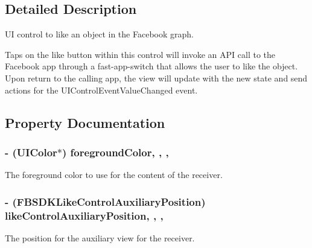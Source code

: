 \subsection{Detailed Description}
U\+I control to like an object in the Facebook graph.

Taps on the like button within this control will invoke an A\+P\+I call to the Facebook app through a fast-\/app-\/switch that allows the user to like the object. Upon return to the calling app, the view will update with the new state and send actions for the U\+I\+Control\+Event\+Value\+Changed event. 

\subsection{Property Documentation}
\hypertarget{interface_f_b_s_d_k_like_control_a078c28c8d5545d68a6887dc6ce3cd32d}{}
\subsubsection[{foreground\+Color}]{\setlength{\rightskip}{0pt plus 5cm}-\/ (U\+I\+Color$\ast$) foreground\+Color\hspace{0.3cm}{\ttfamily [read]}, {\ttfamily [write]}, {\ttfamily [nonatomic]}, {\ttfamily [strong]}}\label{interface_f_b_s_d_k_like_control_a078c28c8d5545d68a6887dc6ce3cd32d}
The foreground color to use for the content of the receiver. \hypertarget{interface_f_b_s_d_k_like_control_a3084afe9f906160458653d82544dd772}{}
\subsubsection[{like\+Control\+Auxiliary\+Position}]{\setlength{\rightskip}{0pt plus 5cm}-\/ (F\+B\+S\+D\+K\+Like\+Control\+Auxiliary\+Position) like\+Control\+Auxiliary\+Position\hspace{0.3cm}{\ttfamily [read]}, {\ttfamily [write]}, {\ttfamily [nonatomic]}, {\ttfamily [assign]}}\label{interface_f_b_s_d_k_like_control_a3084afe9f906160458653d82544dd772}
The position for the auxiliary view for the receiver.

